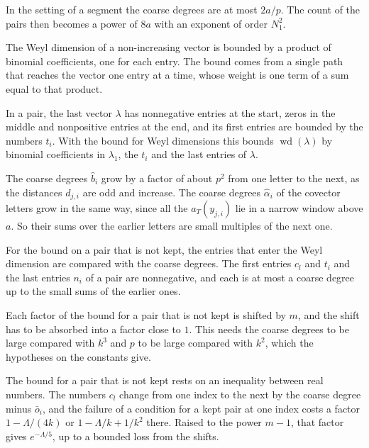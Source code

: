 In the setting of a segment the coarse degrees are at most $2a/p$. The count of the pairs then becomes a power of $8a$
with an exponent of order $N_1^2$.

The Weyl dimension of a non-increasing vector is bounded by a product of binomial coefficients, one for each entry. The
bound comes from a single path that reaches the vector one entry at a time, whose weight is one term of a sum equal to
that product.

In a pair, the last vector $\lambda$ has nonnegative entries at the start, zeros in the middle and nonpositive entries at
the end, and its first entries are bounded by the numbers $t_i$. With the bound for Weyl dimensions this bounds
$\operatorname{wd}(\lambda)$ by binomial coefficients in $\lambda_1$, the $t_i$ and the last entries of $\lambda$.

The coarse degrees $\hat b_i$ grow by a factor of about $p^2$ from one letter to the next, as the distances $d_{j,i}$ are
odd and increase. The coarse degrees $\hat\alpha_i$ of the covector letters grow in the same way, since all the $a_T(y_{j,i})$
lie in a narrow window above $a$. So their sums over the earlier letters are small multiples of the next one.

For the bound on a pair that is not kept, the entries that enter the Weyl dimension are compared with the coarse degrees.
The first entries $c_l$ and $t_i$ and the last entries $n_i$ of a pair are nonnegative, and each is at most a coarse degree
up to the small sums of the earlier ones.

Each factor of the bound for a pair that is not kept is shifted by $m$, and the shift has to be absorbed into a factor
close to $1$. This needs the coarse degrees to be large compared with $k^3$ and $p$ to be large compared with $k^2$, which
the hypotheses on the constants give.

The bound for a pair that is not kept rests on an inequality between real numbers. The numbers $c_l$ change from one
index to the next by the coarse degree minus $\bar o_i$, and the failure of a condition for a kept pair at one index costs a
factor $1-\Lambda/(4k)$ or $1-\Lambda/k+1/k^2$ there. Raised to the power $m-1$, that factor gives $e^{-\Lambda/5}$, up to
a bounded loss from the shifts.

